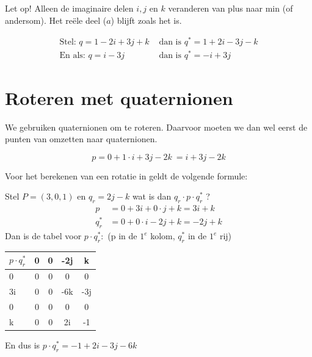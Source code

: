 Let op! Alleen de imaginaire delen $i, j$ en $k$ veranderen van plus naar min (of andersom). Het reële deel ($a$) blijft zoals het is. 

\begin{align*}
  \text{Stel: } q = 1 - 2i + 3j + k &\text{ dan is } q^* = 1 + 2i - 3j - k \\
  \text{En als: } q = i - 3j  &\text{ dan is } q^* = -i + 3j
\end{align*}

\section{Roteren met quaternionen}
We gebruiken quaternionen om te roteren. Daarvoor moeten we dan wel eerst de punten van \RD omzetten naar quaternionen.


\[
    p=0 + 1\cdot i+3j-2k\ = i+3j-2k
\]

Voor het berekenen van een rotatie in \RD geldt de volgende formule: 

\newpage
\setlength{\abovedisplayskip}{5pt}
\setlength{\belowdisplayskip}{5pt}

Stel $P = (3,0,1)$ en $q_r = 2j-k$ wat is dan $q_r\cdot p\cdot q^*_r $ ?
\begin{align*}
	  p &= 0 + 3i + 0\cdot j + k = 3i+k  \\
	q^*_r &= 0 + 0\cdot i -2j  + k = -2j+k 
\end{align*} 
Dan is de tabel voor $p\cdot q^*_r: $ \quad (p in de $1^e$ kolom, $q^*_r$ in de $1^e$ rij)
	\begin{center}
		\begin{tabular}{ | l || c | c |c |c |}
			\hline
	$ p\cdot q^*_r $  & 0 & 0 & -2j & k   \\ \hline \hline
	    		  0 & 0 & 0 & 0   & 0   \\ \hline
                   3i & 0 & 0 & -6k & -3j \\ \hline
                    0 & 0 & 0 & 0   & 0   \\ \hline
                    k & 0 & 0 & 2i  & -1  \\
			\hline 
		\end{tabular}
	\end{center}
En dus is $p\cdot q^*_r = -1+2i-3j-6k$ 
  
